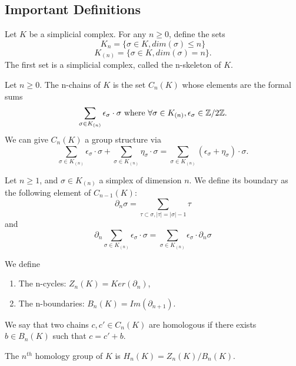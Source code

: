 \subsection{Important Definitions}

\begin{definition}
    Let $K$ be a simplicial complex. For any $n \ge 0$, define the sets
$$K_n = \{\sigma \in K, dim(\sigma) \le n\}$$
$$K_{(n)} = \{\sigma \in K, dim(\sigma) = n\}.$$
The first set is a simplicial complex, called the n-skeleton of $K$.
\end{definition}

\begin{definition}
    Let $n \ge 0$. The n-chains of $K$ is the set $C_n(K)$ whose elements are
    the formal sums
    $$\sum_{\sigma  \in K_{(n)}} \epsilon_{\sigma}\cdot \sigma \text{ where }
    \forall \sigma \in K_{(n)}, \epsilon_{\sigma} \in \mathbb{Z}/2\mathbb{Z}.$$
    We can give $C_n(K)$ a group structure via
    $$
    \sum_{\sigma \in K_{(n)}} \epsilon_{\sigma} \cdot \sigma + \sum_{\sigma \in K_{(n)}} \eta_{\sigma} \cdot \sigma = \sum_{\sigma \in K_{(n)}} (\epsilon_{\sigma} + \eta_{\sigma}) \cdot \sigma.$$
\end{definition}

\begin{definition}
    Let $n \ge 1$, and $\sigma \in K_{(n)}$ a simplex of dimension $n$. We
    define its boundary as the following element of $C_{n-1}(K)$:
    $$
    \partial_n \sigma = \sum_{\tau \subset \sigma, |\tau| = |\sigma| - 1} \tau
    $$ and 
    $$
    \partial_n \sum_{\sigma \in K_{(n)}} \epsilon_{\sigma} \cdot \sigma  =  \sum_{\sigma \in K_{(n)}} \epsilon_{\sigma} \cdot \partial_n \sigma 
    $$
\end{definition}

\begin{definition}
    We define
    \begin{enumerate}
        \item The n-cycles: $Z_n(K) = Ker(\partial_n)$,
        \item The n-boundaries: $B_n(K) = Im(\partial_{n+1}).$
    \end{enumerate}
    We say that two chains $c, c' \in C_n(K)$ are homologous if there exists
    $b \in B_n(K)$ such that $c = c' + b$.
\end{definition}

\begin{definition}
    The $n^{th}$ homology group of $K$ is $H_n(K) = Z_n(K)/B_n(K)$.
\end{definition}


